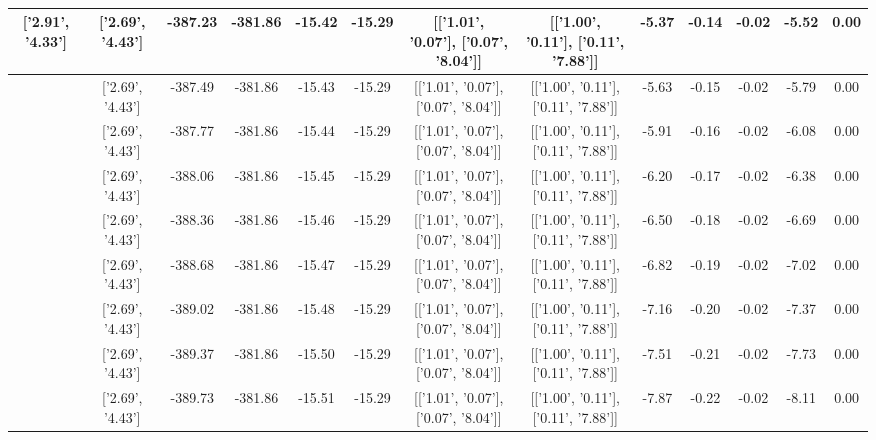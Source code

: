 \begin{table}[htbp]
\begin{adjustbox}{angle=90}
\begin{tabular}{|c|c|c|c|c|c|c|c|c|c|c|c|c|}
 ['2.91', '4.33'] & ['2.69', '4.43'] & -387.23 & -381.86 & -15.42 & -15.29 & [['1.01', '0.07'], ['0.07', '8.04']] & [['1.00', '0.11'], ['0.11', '7.88']] & -5.37 & -0.14 & -0.02 & -5.52 & 0.00\\ \hline
 ['2.92', '4.32'] & ['2.69', '4.43'] & -387.49 & -381.86 & -15.43 & -15.29 & [['1.01', '0.07'], ['0.07', '8.04']] & [['1.00', '0.11'], ['0.11', '7.88']] & -5.63 & -0.15 & -0.02 & -5.79 & 0.00\\ \hline
 ['2.93', '4.31'] & ['2.69', '4.43'] & -387.77 & -381.86 & -15.44 & -15.29 & [['1.01', '0.07'], ['0.07', '8.04']] & [['1.00', '0.11'], ['0.11', '7.88']] & -5.91 & -0.16 & -0.02 & -6.08 & 0.00\\ \hline
 ['2.94', '4.31'] & ['2.69', '4.43'] & -388.06 & -381.86 & -15.45 & -15.29 & [['1.01', '0.07'], ['0.07', '8.04']] & [['1.00', '0.11'], ['0.11', '7.88']] & -6.20 & -0.17 & -0.02 & -6.38 & 0.00\\ \hline
 ['2.96', '4.30'] & ['2.69', '4.43'] & -388.36 & -381.86 & -15.46 & -15.29 & [['1.01', '0.07'], ['0.07', '8.04']] & [['1.00', '0.11'], ['0.11', '7.88']] & -6.50 & -0.18 & -0.02 & -6.69 & 0.00\\ \hline
 ['2.97', '4.30'] & ['2.69', '4.43'] & -388.68 & -381.86 & -15.47 & -15.29 & [['1.01', '0.07'], ['0.07', '8.04']] & [['1.00', '0.11'], ['0.11', '7.88']] & -6.82 & -0.19 & -0.02 & -7.02 & 0.00\\ \hline
 ['2.98', '4.29'] & ['2.69', '4.43'] & -389.02 & -381.86 & -15.48 & -15.29 & [['1.01', '0.07'], ['0.07', '8.04']] & [['1.00', '0.11'], ['0.11', '7.88']] & -7.16 & -0.20 & -0.02 & -7.37 & 0.00\\ \hline
 ['2.99', '4.28'] & ['2.69', '4.43'] & -389.37 & -381.86 & -15.50 & -15.29 & [['1.01', '0.07'], ['0.07', '8.04']] & [['1.00', '0.11'], ['0.11', '7.88']] & -7.51 & -0.21 & -0.02 & -7.73 & 0.00\\ \hline
 ['3.01', '4.28'] & ['2.69', '4.43'] & -389.73 & -381.86 & -15.51 & -15.29 & [['1.01', '0.07'], ['0.07', '8.04']] & [['1.00', '0.11'], ['0.11', '7.88']] & -7.87 & -0.22 & -0.02 & -8.11 & 0.00\\ \hline
            \end{tabular}
        \end{adjustbox}
        \caption{}
        \label{}
    \end{table}
    